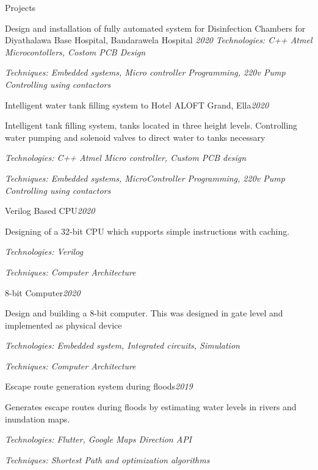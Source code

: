 \documentclass{resume} %
\begin{document}
\begin{rSection}{Projects}
\begin{rSubsection}{Design and installation of fully automated system for Disinfection Chambers for Diyathalawa Base Hospital, Bandarawela Hospital }{\em {2020}}{}{}
\textit{Technologies: C++ Atmel Microcontollers, Costom PCB Design}
\item \textit{Techniques: Embedded systems, Micro controller Programming, 220v Pump Controlling using contactors}
\end{rSubsection}

\begin{rSubsection}{Intelligent water tank filling system to Hotel ALOFT Grand, Ella}{\em {2020}}{}{}
\item Intelligent tank filling system, tanks located in three height levels. Controlling water pumping and solenoid valves to direct water to tanks necessary\item 
\textit{Technologies: C++ Atmel Micro controller, Custom PCB design }
\item \textit{Techniques: Embedded systems, MicroController Programming, 220v Pump Controlling using contactors }
\end{rSubsection}

\begin{rSubsection}{Verilog Based CPU}{\em {2020}}{}{}
\item Designing of a 32-bit CPU which supports simple instructions with caching. \item 
\textit{Technologies: Verilog}
\item \textit{Techniques: Computer Architecture }
\end{rSubsection}


\begin{rSubsection}{8-bit Computer}{\em {2020}}{}{}
\item Design and building a 8-bit computer. This was designed in gate level and implemented as physical device\item 
\textit{Technologies: Embedded system, Integrated circuits, Simulation}
\item \textit{Techniques: Computer Architecture }
\end{rSubsection}

\begin{rSubsection}{Escape route generation system during floods}{\em {2019}}{}{}
\item Generates escape routes during floods by estimating water levels in rivers and inundation maps. \item 
\textit{Technologies: Flutter, Google Maps Direction API}
\item \textit{Techniques: Shortest Path and optimization algorithms}
\end{rSubsection}


\end{rSection}
\end{document}
